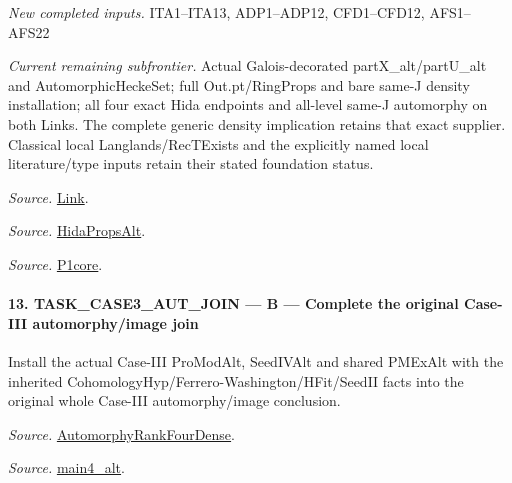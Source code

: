\documentclass[11pt,a4paper]{article}
\numberwithin{equation}{section}
\theoremstyle{remark}\newtheorem{remark}[theorem]{Remark}
\begin{document}
\emph{New completed inputs.} ITA1–ITA13, ADP1–ADP12, CFD1–CFD12, AFS1–AFS22

\emph{Current remaining subfrontier.} Actual Galois-decorated partX\_\allowbreak alt/partU\_\allowbreak alt and AutomorphicHeckeSet; full Out.pt/RingProps and bare same-J density installation; all four exact Hida endpoints and all-level same-J automorphy on both Links. The complete generic density implication retains that exact supplier. Classical local Langlands/RecTExists and the explicitly named local literature/type inputs retain their stated foundation status.

\emph{Source.} \href{https://github.com/CocoSgt/riemann-hypothesis-lean/blob/7cbf7a0c32fca1badf05931879a37c3f8a2b03b4/src/Development/AutomorphicArithmetic/AutomorphicVarieties/WeakShimuraTheory/IsAlgClosureField.lean#L19-L52}{Link}.

\emph{Source.} \href{https://github.com/CocoSgt/riemann-hypothesis-lean/blob/7cbf7a0c32fca1badf05931879a37c3f8a2b03b4/src/Development/AutomorphicArithmetic/AutomorphicVarieties/ModularityArgument/ThresholdArguments/DenseThresholdCases/PointTheoremBaseObject.lean#L32-L38}{HidaPropsAlt}.

\emph{Source.} \href{https://github.com/CocoSgt/riemann-hypothesis-lean/blob/7cbf7a0c32fca1badf05931879a37c3f8a2b03b4/src/Development/AutomorphicArithmetic/AutomorphicVarieties/WeilGroupCharacters/UniversalOrdinaryDeterminantRing.lean#L284-L286}{P1core}.



\paragraph{13. TASK\_\allowbreak CASE3\_\allowbreak AUT\_\allowbreak JOIN — B — Complete the original Case-III automorphy/image join}

Install the actual Case-III ProModAlt, SeedIVAlt and shared PMExAlt with the inherited CohomologyHyp/Ferrero-Washington/HFit/SeedII facts into the original whole Case-III automorphy/image conclusion.

\emph{Source.} \href{https://github.com/CocoSgt/riemann-hypothesis-lean/blob/7cbf7a0c32fca1badf05931879a37c3f8a2b03b4/src/Development/AutomorphicArithmetic/AutomorphicVarieties/ModularityArgument/ThresholdArguments/DenseThresholdCases/PromodularityCaseThree.lean#L43-L44}{AutomorphyRankFourDense}.

\emph{Source.} \href{https://github.com/CocoSgt/riemann-hypothesis-lean/blob/7cbf7a0c32fca1badf05931879a37c3f8a2b03b4/src/Development/AutomorphicArithmetic/AutomorphicVarieties/ModularityArgument/ThresholdArguments/DenseThresholdCases/CuFinal.lean#L44-L44}{main4\_\allowbreak alt}.
\end{document}
